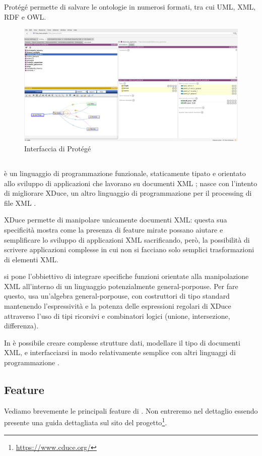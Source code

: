 Protégé permette di salvare le ontologie in numerosi formati, tra cui UML, XML, RDF e OWL.
\begin{figure}[h]
	\centering
	\includegraphics[width=\textwidth]{Picture/interface_protege.png}
	\caption{Interfaccia di Protégé}
\end{figure}
\subsection{\cduce}\label{cduce_intro}
\cduce è un linguaggio di programmazione funzionale, staticamente tipato e orientato allo sviluppo di applicazioni che lavorano su documenti XML \cite{cduceLanguage}; nasce con l'intento di migliorare XDuce, un altro linguaggio di programmazione per il processing di file XML \cite{hosoya2003xduce}. 

XDuce permette di manipolare unicamente documenti XML: questa sua specificità mostra come la presenza di feature mirate possano aiutare e semplificare lo sviluppo di applicazioni XML sacrificando, però, la possibilità di scrivere applicazioni complesse in cui non si facciano solo semplici trasformazioni di elementi XML.

\cduce si pone l'obbiettivo di integrare specifiche funzioni orientate alla manipolazione XML all'interno di un linguaggio potenzialmente general-porpouse. Per fare questo, \cduce usa un'algebra general-porpouse, con costruttori di tipo standard mantenendo l'espressività e la potenza delle espressioni regolari di XDuce attraverso l'uso di tipi ricorsivi e combinatori logici (unione, intersezione, differenza).

In \cduce è possibile creare complesse strutture dati, modellare il tipo di documenti XML, e interfacciarsi in modo relativamente semplice con altri linguaggi di programmazione \cite{cduceLanguage}.
\subsection{Feature}\label{fature_cduce}
Vediamo brevemente le principali feature di \cduce. Non entreremo nel dettaglio essendo presente una guida dettagliata sul sito del progetto\footnote{\url{https://www.cduce.org/}}.
